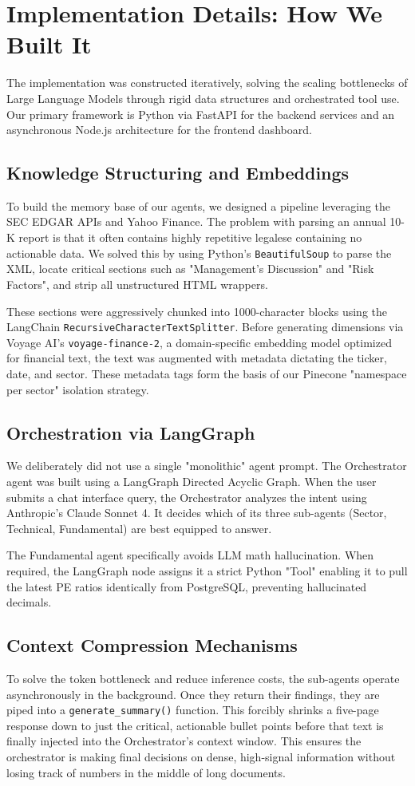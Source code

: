 \section{Implementation Details: How We Built It}

The implementation was constructed iteratively, solving the scaling bottlenecks of Large Language Models through rigid data structures and orchestrated tool use. Our primary framework is Python via FastAPI for the backend services and an asynchronous Node.js architecture for the frontend dashboard. 

\subsection{Knowledge Structuring and Embeddings}
To build the memory base of our agents, we designed a pipeline leveraging the SEC EDGAR APIs and Yahoo Finance. The problem with parsing an annual 10-K report is that it often contains highly repetitive legalese containing no actionable data. We solved this by using Python's \texttt{BeautifulSoup} to parse the XML, locate critical sections such as "Management's Discussion" and "Risk Factors", and strip all unstructured HTML wrappers. 

These sections were aggressively chunked into 1000-character blocks using the LangChain \texttt{RecursiveCharacterTextSplitter}. Before generating dimensions via Voyage AI's \texttt{voyage-finance-2}, a domain-specific embedding model optimized for financial text, the text was augmented with metadata dictating the ticker, date, and sector. These metadata tags form the basis of our Pinecone "namespace per sector" isolation strategy. 

\subsection{Orchestration via LangGraph}
We deliberately did not use a single "monolithic" agent prompt. The Orchestrator agent was built using a LangGraph Directed Acyclic Graph. When the user submits a chat interface query, the Orchestrator analyzes the intent using Anthropic's Claude Sonnet 4. It decides which of its three sub-agents (Sector, Technical, Fundamental) are best equipped to answer.

The Fundamental agent specifically avoids LLM math hallucination. When required, the LangGraph node assigns it a strict Python "Tool" enabling it to pull the latest PE ratios identically from PostgreSQL, preventing hallucinated decimals.

\subsection{Context Compression Mechanisms}
To solve the token bottleneck and reduce inference costs, the sub-agents operate asynchronously in the background. Once they return their findings, they are piped into a \texttt{generate\_summary()} function. This forcibly shrinks a five-page response down to just the critical, actionable bullet points before that text is finally injected into the Orchestrator's context window. This ensures the orchestrator is making final decisions on dense, high-signal information without losing track of numbers in the middle of long documents.
